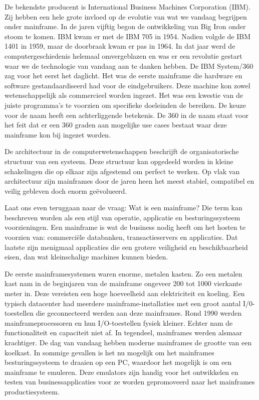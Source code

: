 De bekendste producent is International Business Machines Corporation (IBM). Zij hebben een hele grote invloed op de evolutie van wat we vandaag begrijpen onder mainframe. In de jaren vijftig begon de ontwikkeling van Big Iron onder stoom te komen. IBM kwam er met de IBM 705 in 1954. Nadien volgde de IBM 1401 in 1959, maar de doorbraak kwam er pas in 1964. In dat jaar werd de computergeschiedenis helemaal omvergeblazen en was er een revolutie gestart waar we de technologie van vandaag aan te danken hebben. De IBM System/360 zag voor het eerst het daglicht. Het was de eerste mainframe die hardware en software gestandaardiseerd had voor de eindgebruikers. Deze machine kon zowel wetenschappelijk als commercieel worden ingezet. Het was een kwestie van de juiste programma’s te voorzien om specifieke doeleinden de bereiken. De keuze voor de naam heeft een achterliggende betekenis. De 360 in de naam staat voor het feit dat er een 360 graden aan mogelijke use cases bestaat waar deze mainframe kon bij ingezet worden.

De architectuur in de computerwetenschappen beschrijft de organisatorische structuur van een systeem. Deze structuur kan opgedeeld worden in kleine schakelingen die op elkaar zijn afgestemd om perfect te werken. Op vlak van architectuur zijn mainframes door de jaren heen het meest stabiel, compatibel en veilig gebleven doch enorm geëvolueerd. 

Laat ons even teruggaan naar de vraag: Wat is een mainframe? Die term kan beschreven worden als een stijl van operatie, applicatie en besturingssysteem voorzieningen. Een mainframe is wat de business nodig heeft om het hosten te voorzien van: commerciële databanken, transactieservers en applicaties. Dat laatste zijn menigmaal applicaties die een grotere veiligheid en beschikbaarheid eisen, dan wat kleinschalige machines kunnen bieden. 

De eerste mainframesystemen waren enorme, metalen kasten. Zo een metalen kast nam in de beginjaren van de mainframe ongeveer 200 tot 1000 vierkante meter in. Deze vereisten een hoge hoeveelheid aan elektriciteit en koeling. Een typisch datacenter had meerdere mainframe-installaties met een groot aantal I/0-toestellen die geconnecteerd werden aan deze mainframes. Rond 1990 werden mainframeprocessoren en hun I/O-toestellen fysiek kleiner. Echter nam de functionaliteit en capaciteit niet af. In tegendeel, mainframes werden alsmaar krachtiger. De dag van vandaag hebben moderne mainframes de grootte van een koelkast. In sommige gevallen is het nu mogelijk om het mainframes besturingssysteem te draaien op een PC, waardoor het mogelijk is om een mainframe te emuleren. Deze emulators zijn handig voor het ontwikkelen en testen van businessapplicaties voor ze worden gepromoveerd naar het mainframes productiesysteem. 

